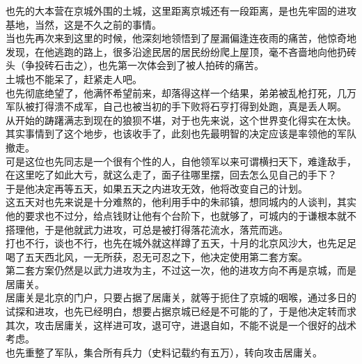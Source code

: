 \begin{multicols}{\theparacolNo}
也先的大本营在京城外围的土城，这里距离京城还有一段距离，是也先牢固的进攻基地，当然，这是不久之前的事情。\\

当也先再次来到这里的时候，他深刻地领悟到了屋漏偏逢连夜雨的痛苦，他惊奇地发现，在他逃跑的路上，很多沿途民居的居民纷纷爬上屋顶，毫不吝啬地向他扔砖头（争投砖石击之），也先第一次体会到了被人拍砖的痛苦。\\

土城也不能呆了，赶紧走人吧。\\

也先彻底绝望了，他满怀希望前来，却落得这样一个结果，弟弟被乱枪打死，几万军队被打得溃不成军，自己也被当初的手下败将石亨打得到处跑，真是丢人啊。\\

从开始的踌躇满志到现在的狼狈不堪，对于也先来说，这个世界变化得实在太快。\\

其实事情到了这个地步，也该收手了，此刻也先最明智的决定应该是率领他的军队撤走。\\

可是这位也先同志是一个很有个性的人，自他领军以来可谓横扫天下，难逢敌手，在这里吃了如此大亏，就这么走了，面子往哪里摆，回去怎么见自己的手下？\\

于是他决定再等五天，如果五天之内进攻无效，他将改变自己的计划。\\

这五天对也先来说是十分难熬的，他利用手中的朱祁镇，想同城内的人谈判，其实他的要求也不过分，给点钱财让他有个台阶下，也就够了，可城内的于谦根本就不搭理他，于是他就武力进攻，可总是被打得落花流水，落荒而逃。\\

打也不行，谈也不行，也先在城外就这样蹲了五天，十月的北京风沙大，也先足足喝了五天西北风，一无所获，忍无可忍之下，他决定使用第二套方案。\\

第二套方案仍然是以武力进攻为主，不过这一次，他的进攻方向不再是京城，而是居庸关。\\

居庸关是北京的门户，只要占据了居庸关，就等于扼住了京城的咽喉，通过多日的试探和进攻，也先已经明白，想要占据京城已经是不可能的了，于是他决定转而求其次，攻击居庸关，这样进可攻，退可守，进退自如，不能不说是一个很好的战术考虑。\\

也先重整了军队，集合所有兵力（史料记载约有五万），转向攻击居庸关。\\


\end{multicols}
